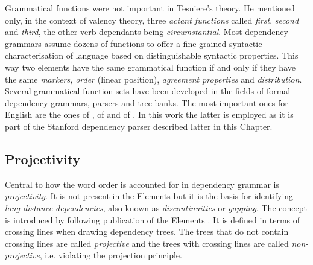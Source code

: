     Grammatical functions were not important in Tesniere's theory. He mentioned only, in the context of valency theory, three \textit{actant functions} called \textit{first}, \textit{second} and \textit{third}, the other verb dependants being \textit{circumstantial}. Most dependency grammars assume dozens of functions to offer a fine-grained syntactic characterisation of language based on distinguishable syntactic properties. This way two elements have the same grammatical function if and only if they have the same \textit{markers,} \textit{order} (linear position), \textit{agreement properties} and \textit{distribution}. Several grammatical function sets have been developed in the fields of formal dependency grammars, parsers and tree-banks. The most important ones for English are the ones of \citet{MelcukPertsov86}, of \citet{Johnson2000} and of \citet{Marneffe2008, Marneffe2008a}. In this work the latter is employed as it is part of the Stanford dependency parser described latter in this Chapter. 

\subsection{Projectivity}
    Central to how the word order is accounted for in dependency grammar is \textit{projectivity}. It is not present in the Elements but it is the basis for identifying \textit{long-distance dependencies}, also known as \textit{discontinuities} or \textit{gapping}. The concept is introduced by \citet{Lecerf1961} following publication of the Elements \citep{Tesniere59}. It is defined in terms of crossing lines when drawing dependency trees. The trees that do not contain crossing lines are called \textit{projective} and the trees with crossing lines are called \textit{non-projective}, i.e. violating the projection principle. 

